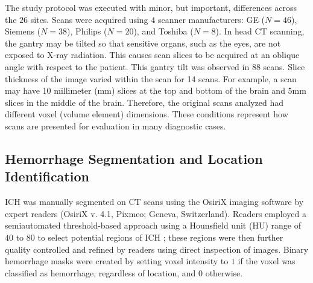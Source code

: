 \documentclass{elsarticle_nonatbib}\usepackage[]{graphicx}\usepackage[]{color}
\begin{document}
The study protocol was executed with minor, but important, differences across the $26$ sites.  Scans were acquired using $4$ scanner manufacturers: GE ($N=46$),  Siemens ($N=38$),  Philips ($N=20$),  and Toshiba ($N=8$).   In head CT scanning, the gantry may be tilted so that sensitive organs, such as the eyes, are not exposed to X-ray radiation.  This causes scan slices to be acquired at an oblique angle with respect to the patient.  This gantry tilt was observed in 88 scans.
Slice thickness of the image varied within the scan for 14 scans.
For example, a scan may have 10 millimeter (mm) slices at the top and bottom of the brain and 5mm slices in the middle of the brain.  Therefore, the original scans analyzed had different voxel (volume element) dimensions.  These conditions represent how scans are presented for evaluation in many diagnostic cases.



\subsection{Hemorrhage Segmentation and Location Identification}
ICH was manually segmented on CT scans using the OsiriX imaging software by expert readers (OsiriX v. 4.1, Pixmeo; Geneva, Switzerland).  Readers employed a semiautomated threshold-based approach using a Hounsfield unit (HU) range of $40$ to $80$ to select potential regions of ICH \citep{bergstrom_variation_1977, smith_imaging_2006}; these regions were then further quality controlled and refined by readers using direct inspection of images.  Binary hemorrhage masks were created by setting voxel intensity to $1$ if the voxel was classified as hemorrhage, regardless of location, and $0$ otherwise.  
\end{document}
